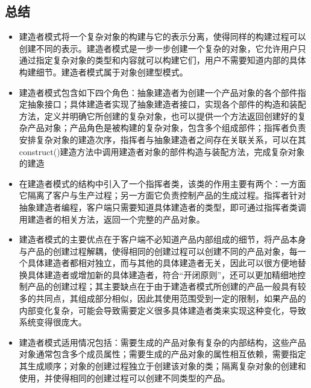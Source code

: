 \documentclass[letterpaper,10pt,english]{sphinxmanual}
\begin{document}
\subsection{总结}
\label{\detokenize{creational_patterns/builder:id15}}\begin{itemize}
\item {} 
\sphinxAtStartPar
建造者模式将一个复杂对象的构建与它的表示分离，使得同样的构建过程可以创建不同的表示。建造者模式是一步一步创建一个复杂的对象，它允许用户只通过指定复杂对象的类型和内容就可以构建它们，用户不需要知道内部的具体构建细节。建造者模式属于对象创建型模式。

\item {} 
\sphinxAtStartPar
建造者模式包含如下四个角色：抽象建造者为创建一个产品对象的各个部件指定抽象接口；具体建造者实现了抽象建造者接口，实现各个部件的构造和装配方法，定义并明确它所创建的复杂对象，也可以提供一个方法返回创建好的复杂产品对象；产品角色是被构建的复杂对象，包含多个组成部件；指挥者负责安排复杂对象的建造次序，指挥者与抽象建造者之间存在关联关系，可以在其construct()建造方法中调用建造者对象的部件构造与装配方法，完成复杂对象的建造

\item {} 
\sphinxAtStartPar
在建造者模式的结构中引入了一个指挥者类，该类的作用主要有两个：一方面它隔离了客户与生产过程；另一方面它负责控制产品的生成过程。指挥者针对抽象建造者编程，客户端只需要知道具体建造者的类型，即可通过指挥者类调用建造者的相关方法，返回一个完整的产品对象。

\item {} 
\sphinxAtStartPar
建造者模式的主要优点在于客户端不必知道产品内部组成的细节，将产品本身与产品的创建过程解耦，使得相同的创建过程可以创建不同的产品对象，每一个具体建造者都相对独立，而与其他的具体建造者无关，因此可以很方便地替换具体建造者或增加新的具体建造者，符合“开闭原则”，还可以更加精细地控制产品的创建过程；其主要缺点在于由于建造者模式所创建的产品一般具有较多的共同点，其组成部分相似，因此其使用范围受到一定的限制，如果产品的内部变化复杂，可能会导致需要定义很多具体建造者类来实现这种变化，导致系统变得很庞大。

\item {} 
\sphinxAtStartPar
建造者模式适用情况包括：需要生成的产品对象有复杂的内部结构，这些产品对象通常包含多个成员属性；需要生成的产品对象的属性相互依赖，需要指定其生成顺序；对象的创建过程独立于创建该对象的类；隔离复杂对象的创建和使用，并使得相同的创建过程可以创建不同类型的产品。

\end{itemize}

\sphinxstepscope
\end{document}
